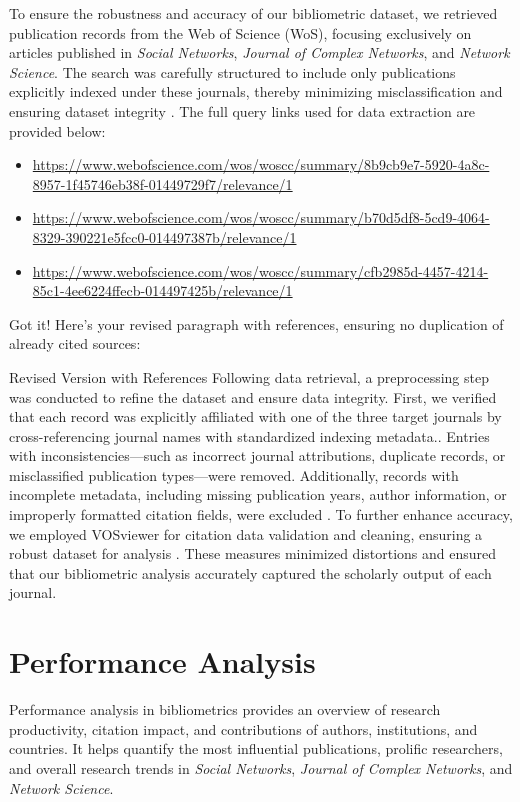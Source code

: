 \documentclass[twocolumn]{article}
\begin{document}
	To ensure the robustness and accuracy of our bibliometric dataset, we retrieved publication records from the Web of Science (WoS), focusing exclusively on articles published in \textit{Social Networks}, \textit{Journal of Complex Networks}, and \textit{Network Science}. The search was carefully structured to include only publications explicitly indexed under these journals, thereby minimizing misclassification and ensuring dataset integrity \cite{Moed2005}. The full query links used for data extraction are provided below:
	\begin{itemize}
		\item \url{https://www.webofscience.com/wos/woscc/summary/8b9cb9e7-5920-4a8c-8957-1f45746eb38f-01449729f7/relevance/1}
		\item 	\url{https://www.webofscience.com/wos/woscc/summary/b70d5df8-5cd9-4064-8329-390221e5fcc0-014497387b/relevance/1}
		\item 	\url{https://www.webofscience.com/wos/woscc/summary/cfb2985d-4457-4214-85c1-4ee6224ffecb-014497425b/relevance/1}
	\end{itemize}
	
	
	Got it! Here’s your revised paragraph with references, ensuring no duplication of already cited sources:
	
	Revised Version with References
	Following data retrieval, a preprocessing step was conducted to refine the dataset and ensure data integrity. First, we verified that each record was explicitly affiliated with one of the three target journals by cross-referencing journal names with standardized indexing metadata.\cite{Donthu2021}. Entries with inconsistencies—such as incorrect journal attributions, duplicate records, or misclassified publication types—were removed. Additionally, records with incomplete metadata, including missing publication years, author information, or improperly formatted citation fields, were excluded \cite{Aria2017}. To further enhance accuracy, we employed VOSviewer for citation data validation and cleaning, ensuring a robust dataset for analysis \cite{vanEck2010}. These measures minimized distortions and ensured that our bibliometric analysis accurately captured the scholarly output of each journal.
	
	
	\section{Performance Analysis}\label{Performance Analysis}
	
	Performance analysis in bibliometrics provides an overview of research productivity, citation impact, and contributions of authors, institutions, and countries\cite{bibid}. It helps quantify the most influential publications, prolific researchers, and overall research trends in \textit{Social Networks}, \textit{Journal of Complex Networks}, and \textit{Network Science}.
	
\end{document}
